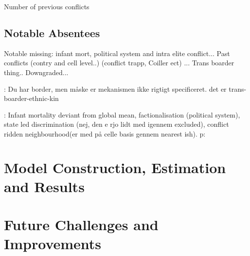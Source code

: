 \documentclass[a4paper]{article}
\begin{document}





\cite{Cederman_Gleditsch_Buhaug_2013} Number of previous conflicts



\subsection{Notable Absentees}\label{notable_absentees} %

Notable missing: infant mort, political system and intra elite conflict... \citep{Goldstone_2010} Past conflicts (contry and cell level..) (conflict trapp, Coiller ect) ... Trans boarder thing.. Downgraded... \citep{Cederman_Gleditsch_Buhaug_2013}

\cite[119-142]{Cederman_Gleditsch_Buhaug_2013}: Du har border, men måske er mekanismen ikke rigtigt specificeret. det er trans-boarder-ethnic-kin

\cite{Goldstone_2010} : Infant mortality deviant from global mean, factionalisation (political system), state led discrimination (nej, den e rjo lidt med igennem excluded), conflict ridden neighbourhood(er med på celle basis gennem nearest ish). p: 



\section{Model Construction, Estimation and Results}


\section{Future Challenges and Improvements}
\end{document}

